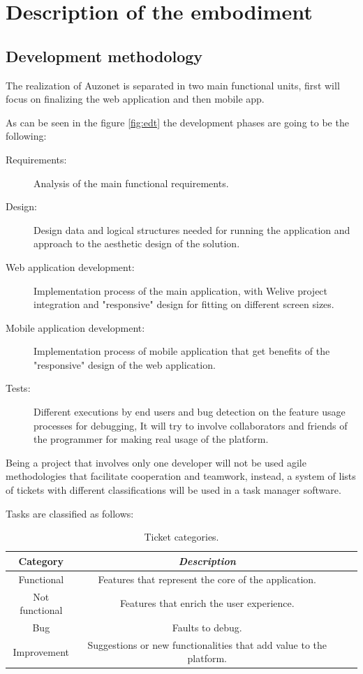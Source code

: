 \documentclass{DeustoFDP}
\begin{document}
\section{Description of the embodiment}
\subsection{Development methodology}
The realization of Auzonet is separated in two main functional units, first will focus on finalizing the web application and then mobile app.

As can be seen in the figure \ref{fig:edt} the development phases are going to be the following:
\begin{description}
	\item[Requirements:] Analysis of the main functional requirements.
	\item[Design:] Design data and logical structures needed for running the application and approach to the aesthetic design of the solution.
	\item[Web application development:] Implementation process of the main application, with Welive project integration and "responsive" design for fitting on different screen sizes.
	\item[Mobile application development:] Implementation process of mobile application that get benefits of the "responsive" design of the web application.
	\item[Tests:] Different executions by end users and bug detection on the feature usage processes for debugging, It will try to involve collaborators and friends of the programmer for making real usage of the platform.
\end{description}

Being a project that involves only one developer will not be used agile methodologies that facilitate cooperation and teamwork, instead, a system of lists of tickets with different classifications will be used in a task manager software.

Tasks are classified as follows:
\begin{table}[H]
	\centering
	\caption{Ticket categories.}\label{tab:ticketcategories}
	\begin{tabular}{cccc}
		\toprule
		\textbf{Category} & \emph{Description}\\
		\midrule
		Functional  & Features that represent the core of the application.\\
		Not functional   & Features that enrich the user experience.\\
		Bug & Faults to debug.\\
		Improvement & Suggestions or new functionalities that add value to the platform.\\
		\bottomrule
	\end{tabular}
\end{table}
\end{document}
